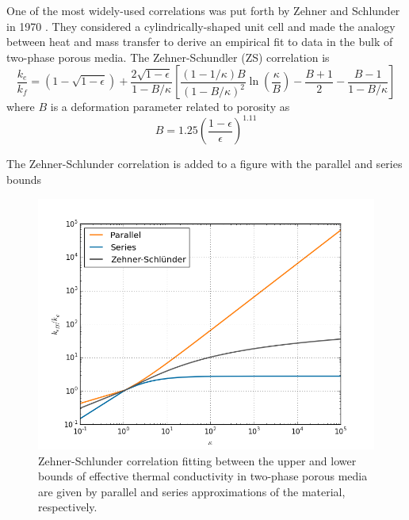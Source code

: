 One of the most widely-used correlations was put forth by Zehner and Schlunder in 1970 \cite{Zehner1970,Zehner1972}. They considered a cylindrically-shaped unit cell and made the analogy between heat and mass transfer to derive an empirical fit to data in the bulk of two-phase porous media. The Zehner-Schundler (ZS) correlation is
\begin{equation}
    \frac{k_e}{k_f} = \left(1-\sqrt{1-\epsilon}\right)+\frac{2\sqrt{1-\epsilon}}{1-B/\kappa}\left[\frac{(1-1/\kappa)B}{(1-B/\kappa)^2}\ln\left( \frac{\kappa}{B} \right) - \frac{B+1}{2} - \frac{B-1}{1-B/\kappa}\right]
\end{equation}
where $B$ is a deformation parameter related to porosity as
\begin{equation}\label{eq:zs-B}
    B = 1.25\left(\frac{1-\epsilon}{\epsilon}\right)^{1.11}
\end{equation}

The Zehner-Schlunder correlation is added to a figure with the parallel and series bounds

\begin{figure}[!h]
    \centering
    \includegraphics[width=\textwidth]{figures/keff-kappa-series-parallel-zs}
    \caption{Zehner-Schlunder correlation fitting between the upper and lower bounds of effective thermal conductivity in two-phase porous media are given by parallel and series approximations of the material, respectively.}
    \label{fig:kappa-series-parallel-zs}
\end{figure}

